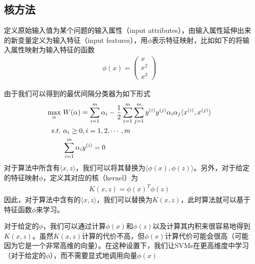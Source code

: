 \subsection{核方法}
定义原始输入值为某个问题的输入属性（input attributes），由输入属性延伸出来的新变量定义为输入特征（input features），用$\phi$表示特征映射，比如如下的将输入属性映射为输入特征的函数
\begin{eqnarray}
\phi(x)=
\begin{pmatrix}
x\\
x^2\\
x^3
\end{pmatrix}
\end{eqnarray}

由于我们可以得到的最优间隔分类器为如下形式
\begin{eqnarray}
\begin{aligned}
\max_\alpha&\ W(\alpha)=\sum_{i=1}^m\alpha_i-\frac{1}{2}\sum_{i=1}^m\sum_{j=1}^m\sample{y}{i}\sample{y}{j}\alpha_i\alpha_j\langle\sample{x}{i},\sample{x}{j}\rangle\\
s.t.&\ \alpha_i\geq 0,i=1,2,\cdots,m\\
&\ \sum_{i=1}^m\alpha_i\sample{y}{i}=0
\end{aligned}
\end{eqnarray}
对于算法中所含有$\langle x,z\rangle$，我们可以将其替换为$\langle\phi(x),\phi(z)\rangle$。另外，对于给定的特征映射$\phi$，定义其对应的核（kernel）为
\begin{eqnarray}
K(x,z)=\phi(x)^T\phi(z)
\end{eqnarray}
因此，对于算法中含有的$\langle x,z\rangle$，我们可以替换为$K(x,z)$，此时算法就可以基于特征函数$\phi$来学习。

对于给定的$\phi$，我们可以通过计算$\phi(x)$和$\phi(z)$以及计算其内积来很容易地得到$K(x,z)$。虽然$K(x,z)$计算的代价不高，但$\phi(x)$计算代价可能会很高（可能因为它是一个非常高维的向量）。在这种设置下，我们让SVMs在更高维度中学习（对于给定的$\phi$），而不需要显式地调用向量$\phi(x)$

